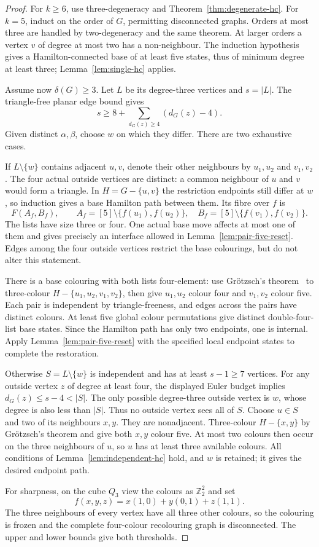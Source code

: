 \documentclass[11pt]{article}
\theoremstyle{remark}
\numberwithin{equation}{section}
\numberwithin{table}{section}
\begin{document}
\begin{proof}
For $k\ge6$, use three-degeneracy and
Theorem~\ref{thm:degenerate-hc}.  For $k=5$, induct on the order of
$G$, permitting disconnected graphs.  Orders at most three are handled
by two-degeneracy and the same theorem.  At larger orders a vertex $v$
of degree at most two has a non-neighbour.  The induction hypothesis
gives a Hamilton-connected base of at least five states, thus of minimum
degree at least three; Lemma~\ref{lem:single-hc} applies.

Assume now $\delta(G)\ge3$.  Let $L$ be its degree-three vertices
and $s=|L|$.  The triangle-free planar edge bound gives
\[
 s\ge8+\sum_{d_G(z)\ge4}(d_G(z)-4).
\]
Given distinct $\alpha,\beta$, choose $w$ on which they differ.
There are two exhaustive cases.

If $L\setminus\{w\}$ contains adjacent $u,v$, denote their other
neighbours by $u_1,u_2$ and $v_1,v_2$.  The four actual outside
vertices are distinct: a common neighbour of $u$ and $v$ would form
a triangle.  In $H=G-\{u,v\}$ the restriction endpoints still differ
at $w$, so induction gives a base Hamilton path between them.  Its
fibre over $f$ is
\[
 F(A_f,B_f),\qquad
 A_f=[5]\setminus\{f(u_1),f(u_2)\},\quad
 B_f=[5]\setminus\{f(v_1),f(v_2)\}.
\]
The lists have size three or four.  One actual base move affects at
most one of them and gives precisely an interface allowed in
Lemma~\ref{lem:pair-five-reset}.  Edges among the four outside
vertices restrict the base colourings, but do not alter this statement.

There is a base colouring with both lists four-element: use
Gr\"otzsch's theorem~\cite{Grotzsch59} to three-colour
$H-\{u_1,u_2,v_1,v_2\}$, then give $u_1,u_2$ colour four and
$v_1,v_2$ colour five.  Each pair is independent by triangle-freeness,
and edges across the pairs have distinct colours.  At least five global
colour permutations give distinct double-four-list base states.  Since
the Hamilton path has only two endpoints, one is internal.  Apply
Lemma~\ref{lem:pair-five-reset} with the specified local endpoint
states to complete the restoration.

Otherwise $S=L\setminus\{w\}$ is independent and has at least
$s-1\ge7$ vertices.  For any outside vertex $z$ of degree at least
four, the displayed Euler budget implies $d_G(z)\le s-4<|S|$.
The only possible degree-three outside vertex is $w$, whose degree is
also less than $|S|$.  Thus no outside vertex sees all of $S$.
Choose $u\in S$ and two of its neighbours $x,y$.  They are
nonadjacent.  Three-colour $H-\{x,y\}$ by Gr\"otzsch's theorem
and give both $x,y$ colour five.  At most two colours then occur on the
three neighbours of $u$, so $u$ has at least three available colours.
All conditions of Lemma~\ref{lem:independent-hc} hold, and $w$ is
retained; it gives the desired endpoint path.

For sharpness, on the cube $Q_3$ view the colours as
$\mathbb Z_2^2$ and set
\[
 f(x,y,z)=x(1,0)+y(0,1)+z(1,1).
\]
The three neighbours of every vertex have all three other colours,
so the colouring is frozen and the complete four-colour recolouring
graph is disconnected.  The upper and lower bounds give both thresholds.
\end{proof}
\end{document}
